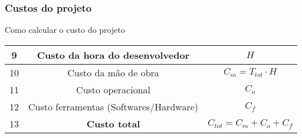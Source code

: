             \subsubsection*{Custos do projeto}
            
                \noindent Como calcular o custo do projeto
                
                \begin{center}
                    
                    \begin{tabular}{| c | c | c |}
                        \hline
                         9  & Custo da hora do desenvolvedor         & $H$ \\ \hline
                         10 & Custo da mão de obra                   & $C_m = T_{tot} \cdot H$ \\ \hline
                         11 & Custo operacional                      & $C_o$ \\ \hline
                         12 & Custo ferramentas (Softwares/Hardware) & $C_f$ \\ \hline \hline
                         13 & \textbf{Custo total}                   & $C_{tot} = C_m + C_o + C_f$ \\ \hline
                    \end{tabular}
                    
                        
                \end{center}
                
